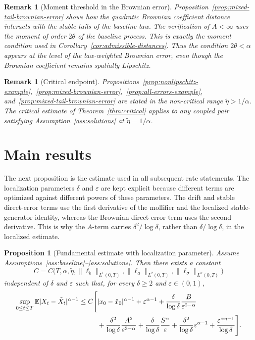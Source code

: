 \documentclass[10pt,a4paper]{amsart}
\newtheorem{proposition}[theorem]{Proposition}
\newtheorem{remark}[theorem]{Remark}
\newcommand{\E}{\mathbb{E}}
\newcommand{\1}{\mathbf{1}}
\newcommand{\wt}{\tilde}
\newcommand{\eps}{\varepsilon}
\begin{document}
\begin{remark}[Moment threshold in the Brownian error]
Proposition~\ref{prop:mixed-tail-brownian-error} shows how the quadratic Brownian coefficient distance interacts with the stable tails of the baseline law. The verification of $A<\infty$ uses the moment of order $2\theta$ of the baseline process. This is exactly the moment condition used in Corollary~\ref{cor:admissible-distances}. Thus the condition $2\theta<\alpha$ appears at the level of the law-weighted Brownian error, even though the Brownian coefficient remains spatially Lipschitz.
\end{remark}

\begin{remark}[Critical endpoint]
Propositions~\ref{prop:nonlipschitz-example},~\ref{prop:mixed-brownian-error},~\ref{prop:all-errors-example}, and~\ref{prop:mixed-tail-brownian-error} are stated in the non-critical range $\wt\eta>1/\alpha$. The critical estimate of Theorem~\ref{thm:critical} applies to any coupled pair satisfying Assumption~\ref{ass:solutions} at $\wt\eta=1/\alpha$.
\end{remark}

\section{Main results}
\label{sec:main-results}

The next proposition is the estimate used in all subsequent rate statements. The localization parameters $\delta$ and $\eps$ are kept explicit because different terms are optimized against different powers of these parameters. The drift and stable direct-error terms use the first derivative of the mollifier and the localized stable-generator identity, whereas the Brownian direct-error term uses the second derivative. This is why the $A$-term carries $\delta^2/\log\delta$, rather than $\delta/\log\delta$, in the localized estimate.

\begin{proposition}[Fundamental estimate with localization parameter]\label{prop:fundamental-delta}
Assume Assumptions~\ref{ass:baseline}--\ref{ass:solutions}. Then there exists a constant
\[
C=C\bigl(T,\alpha,\wt\eta,\|\ell_b\|_{L^1(0,T)},\|\ell_a\|_{L^2(0,T)},\|\ell_\sigma\|_{L^\alpha(0,T)}\bigr)
\]
independent of $\delta$ and $\eps$ such that, for every $\delta\ge2$ and $\eps\in(0,1)$,
\begin{align}
\sup_{0\le t\le T}\E|X_t-\wt X_t|^{\alpha-1}
\le C\Bigg[&|x_0-\wt x_0|^{\alpha-1}
+\eps^{\alpha-1}
+\frac{\delta}{\log\delta}\frac{B}{\eps^{2-\alpha}} \notag\\
&+\frac{\delta^2}{\log\delta}\frac{A^2}{\eps^{3-\alpha}}
+\frac{\delta}{\log\delta}\frac{S^\alpha}{\eps}
+\frac{\delta^2}{\log\delta}\eps^{\alpha-1}
+\frac{\eps^{\alpha\wt\eta-1}}{\log\delta}
\Bigg]. \label{eq:fundamental-delta}
\end{align}
\end{proposition}
\end{document}
